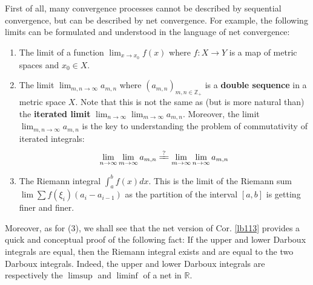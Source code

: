 \documentclass[12pt,b5paper,notitlepage]{article}
\theoremstyle{definition}
\theoremstyle{plain}
\newcommand{\Zbb}{\mathbb Z}
\newcommand{\Rbb}{\mathbb R}
\newcommand{\dps}{\displaystyle}
\numberwithin{equation}{section}
\begin{document}
First of all, many convergence processes cannot be described by sequential convergence, but can be described by net convergence. For example, the following limits can be formulated and understood in the language of net convergence:
\begin{enumerate}[label=(\arabic*)]
\item The limit of a function $\lim_{x\rightarrow x_0}f(x)$ where $f:X\rightarrow Y$ is a map of metric spaces and $x_0\in X$.
\item The limit $\dps\lim_{m,n\rightarrow\infty}a_{m,n}$ where $(a_{m,n})_{m,n\in\Zbb_+}$ is a \textbf{double sequence} in a metric space $X$. Note that this is not the same as (but is more natural than) the \textbf{iterated limit} $\dps\lim_{n\rightarrow\infty}\lim_{m\rightarrow\infty} a_{m,n}$. Moreover, the limit $\dps\lim_{m,n\rightarrow\infty}a_{m,n}$ is the key to understanding the problem of commutativity of iterated integrals:
\begin{align*}
\lim_{n\rightarrow\infty}\lim_{m\rightarrow\infty} a_{m,n}\xlongequal{?}\lim_{m\rightarrow\infty}\lim_{n\rightarrow\infty} a_{m,n}
\end{align*}
\item The Riemann integral $\int_a^b f(x)dx$. This is the limit of the Riemann sum $\lim\sum f(\xi_i)(a_i-a_{i-1})$  as the partition of the interval $[a,b]$ is getting finer and finer.
\end{enumerate} 
Moreover, as for (3), we shall see that the net version of Cor. \ref{lb113} provides a quick and conceptual proof of the following fact: If the upper and lower Darboux integrals are equal, then the Riemann integral exists and are equal to the two Darboux integrals. Indeed, the upper and lower Darboux integrals are respectively the $\limsup$ and $\liminf$ of a net in $\Rbb$.
\end{document}
